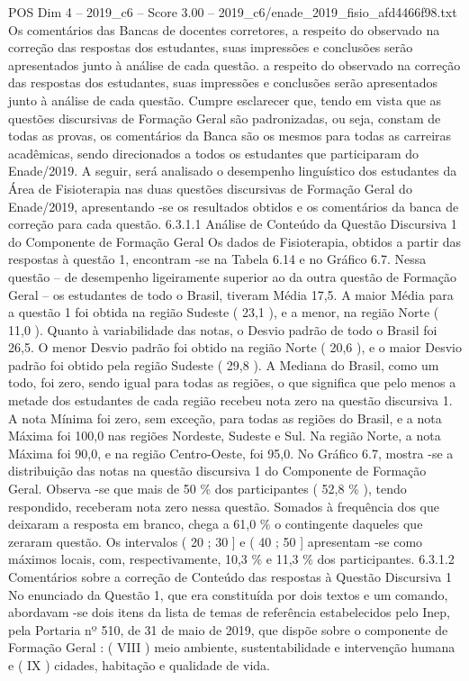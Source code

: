 \begin{textsample}{POS Dim 4 – 2019\_c6 – Score 3.00 – 2019\_c6/enade\_2019\_fisio\_afd4466f98.txt}
Os comentários das Bancas de docentes corretores, a respeito do observado na correção das respostas dos estudantes, suas impressões e conclusões serão apresentados junto à análise de cada questão. a respeito do observado na correção das respostas dos estudantes, suas impressões e conclusões serão apresentados junto à análise de cada questão.
Cumpre esclarecer que, tendo em vista que as questões discursivas de Formação Geral são padronizadas, ou seja, constam de todas as provas, os comentários da Banca são os mesmos para todas as carreiras acadêmicas, sendo direcionados a todos os estudantes que participaram do Enade/2019.
A seguir, será analisado o desempenho linguístico dos estudantes da Área de Fisioterapia nas duas questões discursivas de Formação Geral do Enade/2019, apresentando -se os resultados obtidos e os comentários da banca de correção para cada questão. 6.3.1.1 Análise de Conteúdo da Questão Discursiva 1 do Componente de Formação Geral Os dados de Fisioterapia, obtidos a partir das respostas à questão 1, encontram -se na Tabela 6.14 e no Gráfico 6.7.
Nessa questão – de desempenho ligeiramente superior ao da outra questão de Formação Geral – os estudantes de todo o Brasil, tiveram Média 17,5.
A maior Média para a questão 1 foi obtida na região Sudeste ( 23,1 ), e a menor, na região Norte ( 11,0 ).
Quanto à variabilidade das notas, o Desvio padrão de todo o Brasil foi 26,5.
O menor Desvio padrão foi obtido na região Norte ( 20,6 ), e o maior Desvio padrão foi obtido pela região Sudeste ( 29,8 ).
A Mediana do Brasil, como um todo, foi zero, sendo igual para todas as regiões, o que significa que pelo menos a metade dos estudantes de cada região recebeu nota zero na questão discursiva 1.
A nota Mínima foi zero, sem exceção, para todas as regiões do Brasil, e a nota Máxima foi 100,0 nas regiões Nordeste, Sudeste e Sul.
Na região Norte, a nota Máxima foi 90,0, e na região Centro-Oeste, foi 95,0.
No Gráfico 6.7, mostra -se a distribuição das notas na questão discursiva 1 do Componente de Formação Geral.
Observa -se que mais de 50 \% dos participantes ( 52,8 \% ), tendo respondido, receberam nota zero nessa questão.
Somados à frequência dos que deixaram a resposta em branco, chega a 61,0 \% o contingente daqueles que zeraram questão.
Os intervalos ( 20 ; 30 ] e ( 40 ; 50 ] apresentam -se como máximos locais, com, respectivamente, 10,3 \% e 11,3 \% dos participantes. 6.3.1.2 Comentários sobre a correção de Conteúdo das respostas à Questão Discursiva 1 No enunciado da Questão 1, que era constituída por dois textos e um comando, abordavam -se dois itens da lista de temas de referência estabelecidos pelo Inep, pela Portaria nº 510, de 31 de maio de 2019, que dispõe sobre o componente de Formação Geral : ( VIII ) meio ambiente, sustentabilidade e intervenção humana e ( IX ) cidades, habitação e qualidade de vida.

\end{textsample}
